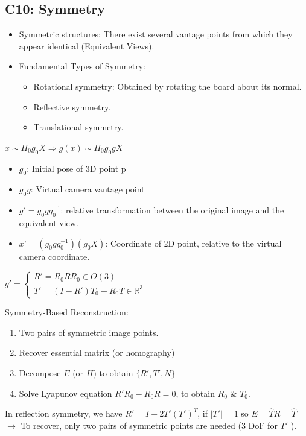\documentclass{../cheat}
\begin{document}
\begin{multicols}{3}
\subsection{C10: Symmetry}
	\begin{itemize}[nolistsep, leftmargin=1em]
		\item Symmetric structures: There exist several vantage points from which they appear identical (Equivalent Views).
		\item Fundamental Types of Symmetry:
		\begin{itemize}
			\item Rotational symmetry: Obtained by rotating the board about its normal.
			\item Reflective symmetry.
			\item Translational symmetry.
		\end{itemize} 
	\end{itemize}
	\centerline{$x \sim \Pi_0 g_0 X     \Rightarrow     g(x)\sim \Pi_0 g_0 g X$}
	\begin{itemize}[nolistsep, leftmargin=1em]
		\item $g_0$: Initial pose of 3D point p
		\item $g_0 g$: Virtual camera vantage point
		\item $g'=g_0 gg_0^{-1}$: relative transformation between the original image and the equivalent view.
		\item $x’ =(g_0 g g_0^{-1})(g_0 X)$: Coordinate of 2D point, relative to the virtual camera coordinate.
	\end{itemize}
	\centerline{$g' = \left\{ \begin{array}{l}
	R'=R_0 R R_0 \in O(3) \\ T'=(I-R')T_0+R_0 T \in \mathbb{R}^3 \end{array}\right.$}
	
	Symmetry-Based Reconstruction:
	\begin{enumerate}[nolistsep, leftmargin=1em]
		\item Two pairs of symmetric image points.
		\item Recover essential matrix (or homography)
		\item Decompose $E$ (or $H$) to obtain $\{R', T', N\}$
		\item Solve Lyapunov equation $R'R_0-R_0R=0$, to obtain $R_0$ \& $T_0$.
	\end{enumerate}
	In reflection symmetry, we have $R'= I-2 T' (T')^T$, if $|T'|=1$ so $E=\widehat{T}R=\widehat{T}$
	$\rightarrow$ To recover, only two pairs of symmetric points are needed (3 DoF for $T'$ ).
	

\end{multicols}
\end{document}
